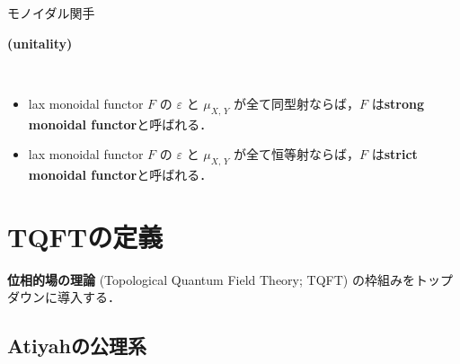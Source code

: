 \documentclass[TQFT_main]{subfiles}
\begin{document}
\begin{mydef}[label=def:monidal-functor,breakable]{モノイダル関手}
\begin{description}
        \item[\textbf{(unitality)}]　
        
        \begin{center}
        \end{center}

        \begin{center}
        \end{center}
        
    \end{description}
    \tcblower
    \begin{itemize}
        \item lax monoidal functor $F$ の $\varepsilon$ と $\mu_{X,\, Y}$ が全て同型射ならば，$F$ は\textbf{strong monoidal functor}と呼ばれる．
        \item lax monoidal functor $F$ の $\varepsilon$ と $\mu_{X,\, Y}$ が全て恒等射ならば，$F$ は\textbf{strict monoidal functor}と呼ばれる．
    \end{itemize}
\end{mydef}


\section{TQFTの定義}

\textbf{位相的場の理論} (Topological Quantum Field Theory; TQFT) の枠組みをトップダウンに導入する．

\subsection{Atiyahの公理系}
\end{document}
